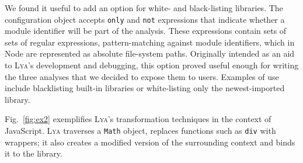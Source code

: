 \documentclass[letterpaper,twocolumn,10pt]{article}
\def\eg{{\em e.g.}, }
\newcommand{\ttt}[1]{\texttt{#1}}
\newcommand{\sys}{{\scshape Lya}\xspace}
\begin{document}




We found it useful to add an option for white- and black-listing libraries.
The configuration object accepts \ttt{only} and \ttt{not} expressions that indicate whether a module identifier will be part of the analysis.
These expressions contain sets of sets of regular expressions, pattern-matching against module identifiers, which in Node are represented as absolute file-system paths.
Originally intended as an aid to \sys's development and debugging, this option proved useful enough for writing the three analyses that we decided to expose them to users.
Examples of use include blacklisting built-in libraries or white-listing only the newest-imported library.



Fig.~\ref{fig:ex2} exemplifies \sys's transformation techniques in the context of JavaScript.
\sys traverses a \ttt{Math} object, replaces functions such as \ttt{div} with wrappers; it also creates a modified version of the surrounding context and binds it to the library.
\end{document}
